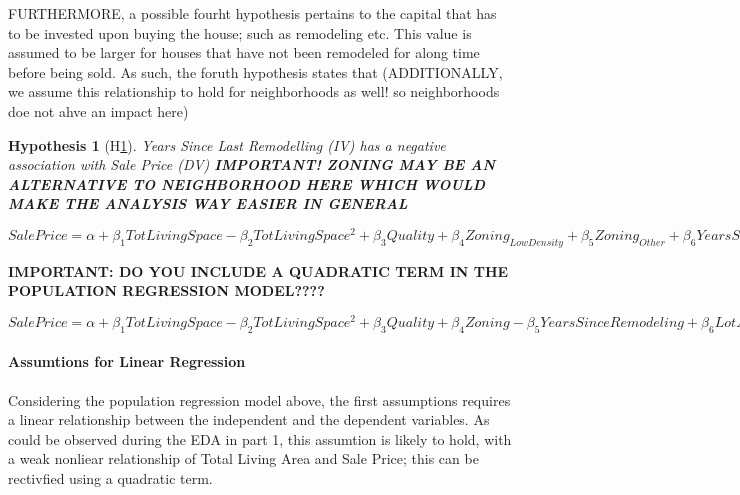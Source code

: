\documentclass{article}
\newtheorem{hyp}{Hypothesis}
\begin{document}
FURTHERMORE, a possible fourht hypothesis pertains to the capital that has to be invested upon buying the house; such as remodeling etc. This value is assumed to be larger for houses that have not been remodeled for along time before being sold. As such, the foruth hypothesis states that (ADDITIONALLY, we assume this relationship to hold for neighborhoods as well! so neighborhoods doe not ahve an impact here)

\begin{hyp}[H\ref{hyp:fourth}] \label{hyp:fourth}
Years Since Last Remodelling (IV) has a negative association with Sale Price (DV)
\textbf{IMPORTANT! ZONING MAY BE AN ALTERNATIVE TO NEIGHBORHOOD HERE WHICH WOULD MAKE THE ANALYSIS WAY EASIER IN GENERAL}
\end{hyp}

\begin{center}
\end{center}




\begin{center}
$ {SalePrice} = \alpha + \beta_{1} TotLivingSpace - \beta_{2}  TotLivingSpace^2 + \beta_{3}  Quality + \beta_{4}  Zoning_{Low Density} + \beta_{5}  Zoning_{Other} + \beta_{6}  YearsSinceRemodeling + \beta_{7}  LotArea + \beta_{8} TotLivingSpace*Zoning_{Low Density} + \beta_{9} TotLivingSpace*Zoning_{Other} +\epsilon$
\end{center}

\textbf{IMPORTANT: DO YOU INCLUDE A QUADRATIC TERM IN THE POPULATION REGRESSION MODEL????}
\begin{center}
$ {SalePrice} = \alpha + \beta_{1} TotLivingSpace - \beta_{2}  TotLivingSpace^2 + \beta_{3}  Quality + \beta_{4}  Zoning - \beta_{5}  YearsSinceRemodeling + \beta_{6}  LotArea + \beta_{7} TotLivingSpace*Zoning + \beta_{8} AdjacentFeatures + \beta_{9} BuildingType \epsilon$
\end{center}




\indent \paragraph{Assumtions for Linear Regression} Considering the population regression model above, the first assumptions requires a linear relationship between the independent and the dependent variables. As could be observed during the EDA in part 1, this assumtion is likely to hold, with a weak nonliear relationship of Total Living Area and Sale Price; this can be rectivfied using a quadratic term. 
\end{document}
